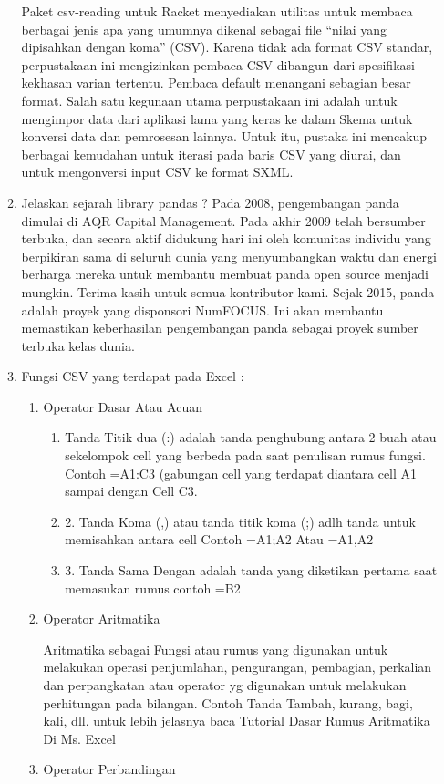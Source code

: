 \begin{enumerate}
\begin{enumerate}
Paket csv-reading untuk Racket menyediakan utilitas untuk membaca berbagai jenis apa yang umumnya dikenal sebagai file “nilai yang dipisahkan dengan koma” (CSV). Karena tidak ada format CSV standar, perpustakaan ini mengizinkan pembaca CSV dibangun dari spesifikasi kekhasan varian tertentu. Pembaca default menangani sebagian besar format.
Salah satu kegunaan utama perpustakaan ini adalah untuk mengimpor data dari aplikasi lama yang keras ke dalam Skema untuk konversi data dan pemrosesan lainnya. Untuk itu, pustaka ini mencakup berbagai kemudahan untuk iterasi pada baris CSV yang diurai, dan untuk mengonversi input CSV ke format SXML.

\item Jelaskan sejarah library pandas ?
Pada 2008, pengembangan panda dimulai di AQR Capital Management. Pada akhir 2009 telah bersumber terbuka, dan secara aktif didukung hari ini oleh komunitas individu yang berpikiran sama di seluruh dunia yang menyumbangkan waktu dan energi berharga mereka untuk membantu membuat panda open source menjadi mungkin. Terima kasih untuk semua kontributor kami.
Sejak 2015, panda adalah proyek yang disponsori NumFOCUS. Ini akan membantu memastikan keberhasilan pengembangan panda sebagai proyek sumber terbuka kelas dunia.
\item Fungsi CSV yang terdapat pada Excel : 

\begin{enumerate}
\item Operator Dasar Atau Acuan
\begin{enumerate}
\item Tanda Titik dua (:) adalah tanda penghubung antara 2 buah atau sekelompok cell yang berbeda pada saat penulisan rumus fungsi. Contoh =A1:C3 (gabungan cell yang terdapat diantara cell A1 sampai dengan Cell C3.
\item 2.	Tanda Koma (,) atau tanda titik koma (;) adlh tanda untuk memisahkan antara cell Contoh =A1;A2 Atau =A1,A2
\item 3.	Tanda Sama Dengan adalah tanda yang diketikan pertama saat memasukan rumus contoh =B2
\end{enumerate}

\item Operator Aritmatika

Aritmatika sebagai Fungsi atau rumus yang digunakan untuk melakukan operasi penjumlahan, pengurangan, pembagian, perkalian dan perpangkatan atau operator yg digunakan untuk melakukan perhitungan pada bilangan. Contoh Tanda Tambah, kurang, bagi, kali, dll. untuk lebih jelasnya baca Tutorial Dasar Rumus Aritmatika Di Ms. Excel
\item Operator Perbandingan


\end{enumerate}
\end{enumerate}
\end{enumerate}
